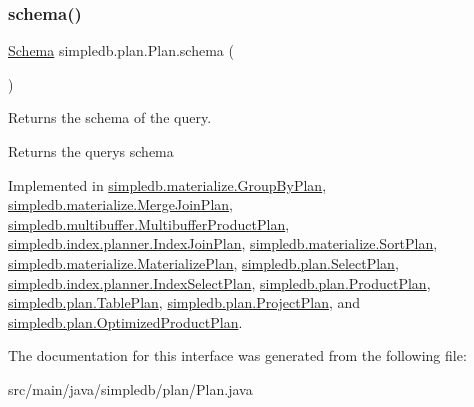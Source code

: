 \mbox{\label{interfacesimpledb_1_1plan_1_1Plan_ad0ee1aa2c4e7147e9f8fc6f3301fa986}} 
\subsubsection{\texorpdfstring{schema()}{schema()}}
{\footnotesize\ttfamily \hyperlink{classsimpledb_1_1record_1_1Schema}{Schema} simpledb.\+plan.\+Plan.\+schema (\begin{DoxyParamCaption}{ }\end{DoxyParamCaption})}

Returns the schema of the query. \begin{DoxyReturn}{Returns}
the query\textquotesingle{}s schema 
\end{DoxyReturn}


Implemented in \hyperlink{classsimpledb_1_1materialize_1_1GroupByPlan_a2060788080c03855f35d72a1742e6ec6}{simpledb.\+materialize.\+Group\+By\+Plan}, \hyperlink{classsimpledb_1_1materialize_1_1MergeJoinPlan_a3e1d4a728b4454d33adc811aa24989f4}{simpledb.\+materialize.\+Merge\+Join\+Plan}, \hyperlink{classsimpledb_1_1multibuffer_1_1MultibufferProductPlan_a8cc53b6bf91a6d7f28ce76c0c226a93f}{simpledb.\+multibuffer.\+Multibuffer\+Product\+Plan}, \hyperlink{classsimpledb_1_1index_1_1planner_1_1IndexJoinPlan_a4dcc700748306498294974d01a5f78fd}{simpledb.\+index.\+planner.\+Index\+Join\+Plan}, \hyperlink{classsimpledb_1_1materialize_1_1SortPlan_a38d147acf86926b81ce04c9ba6216e63}{simpledb.\+materialize.\+Sort\+Plan}, \hyperlink{classsimpledb_1_1materialize_1_1MaterializePlan_aa15451a3ee0639ccca88ca332d050b57}{simpledb.\+materialize.\+Materialize\+Plan}, \hyperlink{classsimpledb_1_1plan_1_1SelectPlan_a74090f0d52af6e4f8d5fe925fac3cb4c}{simpledb.\+plan.\+Select\+Plan}, \hyperlink{classsimpledb_1_1index_1_1planner_1_1IndexSelectPlan_a3010453110b539de5e3af184131dee7a}{simpledb.\+index.\+planner.\+Index\+Select\+Plan}, \hyperlink{classsimpledb_1_1plan_1_1ProductPlan_aefae6a42767a872bc50882b415a9f76c}{simpledb.\+plan.\+Product\+Plan}, \hyperlink{classsimpledb_1_1plan_1_1TablePlan_aeceae838a8fdc6dedfd23e8175374510}{simpledb.\+plan.\+Table\+Plan}, \hyperlink{classsimpledb_1_1plan_1_1ProjectPlan_a748d16b8055b9b3769e6f0713f1da18f}{simpledb.\+plan.\+Project\+Plan}, and \hyperlink{classsimpledb_1_1plan_1_1OptimizedProductPlan_aaeadc35607f4bce16a6f57988e8737b5}{simpledb.\+plan.\+Optimized\+Product\+Plan}.



The documentation for this interface was generated from the following file\+:\begin{DoxyCompactItemize}
\item 
src/main/java/simpledb/plan/Plan.\+java\end{DoxyCompactItemize}

